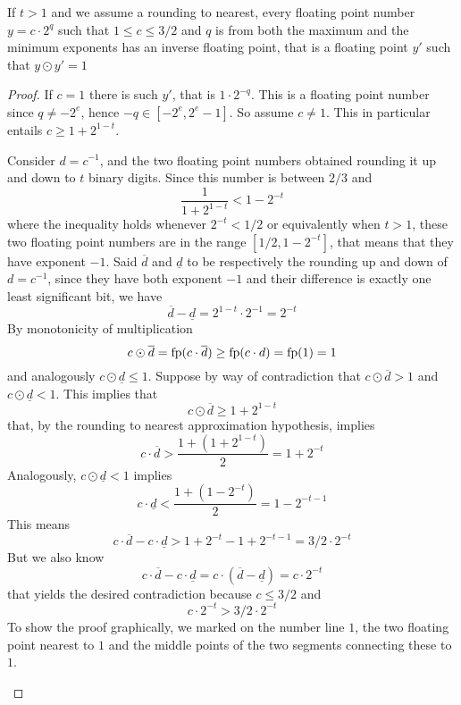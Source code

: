 \begin{prop}
	If $t > 1$ and we assume a rounding to nearest, every floating point number $y = c \cdot 2^q$ such that $1 \le c \le 3/2$ and $q$ is from both the maximum and the minimum exponents has an inverse floating point, that is a floating point $y'$ such that $y \odot y' = 1$
\end{prop}
\begin{proof}
	If $c = 1$ there is such $y'$, that is $1 \cdot 2^{-q}$. This is a floating point number since $q \neq -2^e$, hence $-q \in [-2^e, 2^e - 1]$. So assume $c \neq 1$. This in particular entails $c \ge 1 + 2^{1-t}$.

	Consider $d = c^{-1}$, and the two floating point numbers obtained rounding it up and down to $t$ binary digits. Since this number is between $2/3$ and
	\[
	\frac{1}{1 + 2^{1-t}} < 1 - 2^{-t}
	\]
	where the inequality holds whenever $2^{-t} < 1/2$ or equivalently when $t > 1$, these two floating point numbers are in the range $[1/2, 1 - 2^{-t}]$, that means that they have exponent $-1$. Said $\overline{d}$ and $\underline{d}$ to be respectively the rounding up and down of $d = c^{-1}$, since they have both exponent $-1$ and their difference is exactly one least significant bit, we have
	\[
	\overline{d} - \underline{d} = 2^{1-t} \cdot 2^{-1} = 2^{-t}
	\]
	By monotonicity of multiplication
	\[
	c \odot \overline{d} = \text{fp}(c \cdot \overline{d}) \ge \text{fp}(c \cdot d) = \text{fp}(1) = 1
	\]
	and analogously $c \odot \underline{d} \le 1$.
	Suppose by way of contradiction that $c \odot \overline{d} > 1$ and $c \odot \underline{d} < 1$. This implies that
	\[
	c \odot \overline{d} \ge 1 + 2^{1-t}
	\]
	that, by the rounding to nearest approximation hypothesis, implies
	\[
	c \cdot \overline{d} > \frac{1 + (1 + 2^{1-t})}{2} = 1 + 2^{-t}
	\]
	Analogously, $c \odot \underline{d} < 1$ implies
	\[
	c \cdot \underline{d} < \frac{1 + (1 - 2^{-t})}{2} = 1 - 2^{-t-1}
	\]
	This means
	\[
	c \cdot \overline{d} - c \cdot \underline{d} > 1 + 2^{-t} - 1 + 2^{-t-1} = 3/2 \cdot 2^{-t}
	\]
	But we also know
	\[
	c \cdot \overline{d} - c \cdot \underline{d} = c \cdot (\overline{d} - \underline{d}) = c \cdot 2^{-t}
	\]
	that yields the desired contradiction because $c \le 3/2$ and
	\[
	c \cdot 2^{-t} > 3 / 2 \cdot 2^{-t}
	\]
	To show the proof graphically, we marked on the number line $1$, the two floating point nearest to $1$ and the middle points of the two segments connecting these to $1$.
	\begin{center}
\end{center}
\end{proof}
